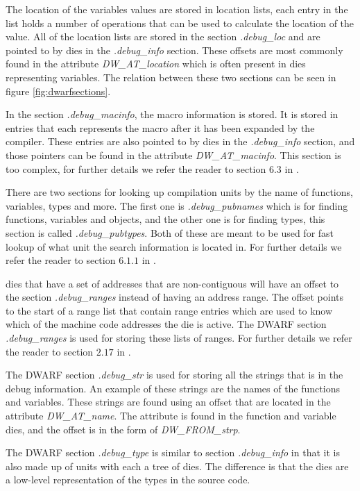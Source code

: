 The location of the variables values are stored in location lists, each entry in the list holds a number of operations that can be used to calculate the location of the value.
All of the location lists are stored in the section \emph{.debug\_loc} and are pointed to by \glspl{die} in the \emph{.debug\_info} section.
These offsets are most commonly found in the attribute \emph{DW\_AT\_location} which is often present in \glspl{die} representing variables.
The relation between these two sections can be seen in figure \ref{fig:dwarfsections}.


In the section \emph{.debug\_macinfo}, the macro information is stored.
It is stored in entries that each represents the macro after it has been expanded by the compiler.
These entries are also pointed to by \glspl{die} in the \emph{.debug\_info} section, and those pointers can be found in the attribute \emph{DW\_AT\_macinfo}.
This section is too complex, for further details we refer the reader to section $6.3$ in \cite{dwarf}.


There are two sections for looking up compilation units by the name of functions, variables, types and more.
The first one is \emph{.debug\_pubnames} which is for finding functions, variables and objects, and the other one is for finding types, this section is called \emph{.debug\_pubtypes}.
Both of these are meant to be used for fast lookup of what unit the search information is located in.
For further details we refer the reader to section $6.1.1$ in \cite{dwarf}.


\Glspl{die} that have a set of addresses that are non-contiguous will have an offset to the section \emph{.debug\_ranges} instead of having an address range.
The offset points to the start of a range list that contain range entries which are used to know which of the machine code addresses the \gls{die} is active.
The \gls{DWARF} section \emph{.debug\_ranges} is used for storing these lists of ranges.
For further details we refer the reader to section $2.17$ in \cite{dwarf}.


The \gls{DWARF} section \emph{.debug\_str} is used for storing all the strings that is in the debug information.
An example of these strings are the names of the functions and variables.
These strings are found using an offset that are located in the attribute \emph{DW\_AT\_name}.
The attribute is found in the function and variable \glspl{die}, and the offset is in the form of \emph{DW\_FROM\_strp}.


The \gls{DWARF} section \emph{.debug\_type} is similar to section \emph{.debug\_info} in that it is also made up of units with each a tree of \glspl{die}.
The difference is that the \glspl{die} are a low-level representation of the types in the source code.

